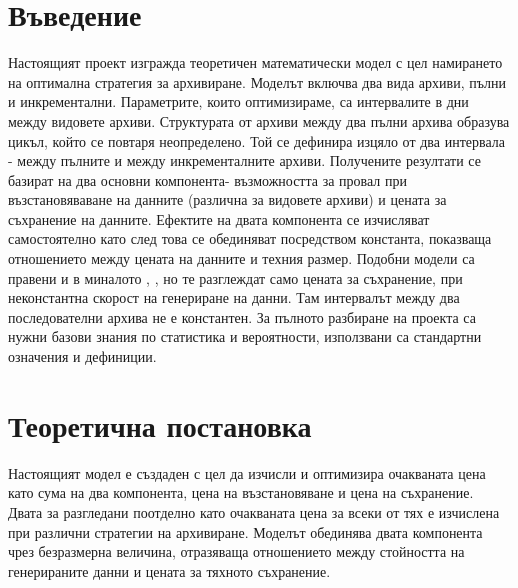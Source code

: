 \documentclass[11pt, a4paper]{article}
\theoremstyle{definition}
\begin{document}
\section{Въведение}
		Настоящият проект изгражда теоретичен математически модел с цел намирането на оптимална стратегия за архивиране. Моделът включва два вида архиви, пълни и инкрементални. Параметрите, които оптимизираме, са интервалите в дни между видовете архиви. Структурата от архиви между два пълни архива образува цикъл, който се повтаря неопределено. Той се дефинира изцяло от два интервала - между пълните и между инкременталните архиви. Получените резултати се базират на два основни компонента- възможността за провал при възстановяваване на данните (различна за видовете архиви) и цената за съхранение на данните. Ефектите на двата компонента се изчисляват самостоятелно като след това се обединяват посредством константа, показваща отношението между цената на данните и техния размер. Подобни модели са правени и в миналото \cite{qian2010optimal}, \cite{nakamura2003optimal}, но те разглеждат само цената за съхранение, при неконстантна скорост на генериране на данни. Там интервалът между два последователни архива не е константен. За пълното разбиране на проекта са нужни базови знания по статистика и вероятности, използвани са стандартни означения и дефиниции.\newpage

\section{Теоретична постановка}
	Настоящият модел е създаден с цел да изчисли и оптимизира очакваната цена като сума на два компонента, цена на възстановяване и цена на съхранение. Двата за разгледани поотделно като очакваната цена за всеки от тях е изчислена при различни стратегии на архивиране. Моделът обединява двата компонента чрез безразмерна величина, отразяваща отношението между стойността на генерираните данни и цената за тяхното съхранение.
\end{document}
